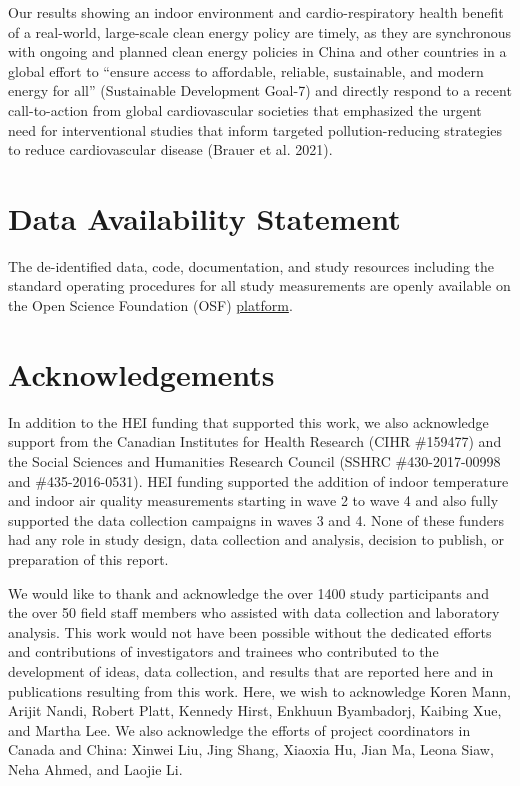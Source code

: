 \documentclass[
  letterpaper,
  DIV=11,
  numbers=noendperiod]{scrartcl}
\begin{document}
Our results showing an indoor environment and cardio-respiratory health
benefit of a real-world, large-scale clean energy policy are timely, as
they are synchronous with ongoing and planned clean energy policies in
China and other countries in a global effort to ``ensure access to
affordable, reliable, sustainable, and modern energy for all''
(Sustainable Development Goal-7) and directly respond to a recent
call-to-action from global cardiovascular societies that emphasized the
urgent need for interventional studies that inform targeted
pollution-reducing strategies to reduce cardiovascular disease (Brauer
et al. 2021).

\section{Data Availability Statement}\label{data-availability-statement}

The de-identified data, code, documentation, and study resources
including the standard operating procedures for all study measurements
are openly available on the Open Science Foundation (OSF)
\href{https://osf.io/8twds/?view_only=c41dd3d6228240d6aad92f81371c5339}{platform}.

\section{Acknowledgements}\label{acknowledgements}

In addition to the HEI funding that supported this work, we also
acknowledge support from the Canadian Institutes for Health Research
(CIHR \#159477) and the Social Sciences and Humanities Research Council
(SSHRC \#430-2017-00998 and \#435-2016-0531). HEI funding
 supported the addition of indoor temperature and indoor
air quality measurements starting in wave 2 to wave 4 and also fully
supported the data collection campaigns in waves 3 and 4. None of these
funders had any role in study design, data collection and analysis,
decision to publish, or preparation of this report.

We would like to thank and acknowledge the over 1400 study participants
and the over 50 field staff members who assisted with data collection
and laboratory analysis. This work would not have been possible without
the dedicated efforts and contributions of investigators and trainees
who contributed to the development of ideas, data collection, and
results that are reported here and in publications resulting from this
work. Here, we wish to acknowledge Koren Mann, Arijit Nandi, Robert
Platt, Kennedy Hirst, Enkhuun Byambadorj, Kaibing Xue, and Martha Lee.
We also acknowledge the efforts of project coordinators in Canada and
China: Xinwei Liu, Jing Shang, Xiaoxia Hu, Jian Ma, Leona Siaw, Neha
Ahmed, and Laojie Li.
\end{document}
